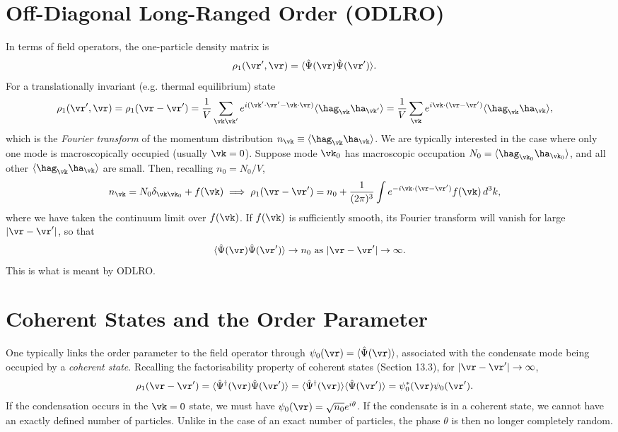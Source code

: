 \documentclass[qo.tex]{subfiles}
\begin{document}
\section{Off-Diagonal Long-Ranged Order (ODLRO)}
In terms of field operators, the one-particle density matrix is 
\begin{align}
    \rho_1(\vr',\vr) &= \langle\hat{\Psi}(\vr)\hat{\Psi}(\vr')\rangle.
\end{align}
For a translationally invariant (e.g. thermal equilibrium) state
\begin{align}
    \rho_1(\vr',\vr) &= \rho_1(\vr-\vr') = \frac{1}{V}\sum_{\vk\vk'} e^{i(\vk'\cdot\vr'-\vk\cdot\vr)}\langle\hag_{\vk}\ha_{\vk'}\rangle = \frac{1}{V}\sum_{\vk}e^{i\vk\cdot(\vr-\vr')}\langle\hag_{\vk}\ha_{\vk}\rangle,
\end{align}
which is the \emph{Fourier transform} of the momentum distribution $n_{\vk}\equiv \langle\hag_{\vk}\ha_{\vk}\rangle$.
We are typically interested in the case where only one mode is macroscopically occupied (usually $\vk=0$).
Suppose mode $\vk_0$ has macroscopic occupation $N_0=\langle\hag_{\vk_0}\ha_{\vk_0}\rangle$, and all other $\langle\hag_{\vk}\ha_{\vk}\rangle$ are small. 
Then, recalling $n_0=N_0/V$,
\begin{align}
    n_{\vk} &= N_0\delta_{\vk\vk_0} + f(\vk) \implies \rho_1(\vr-\vr') = n_0 + \frac{1}{(2\pi)^3}\int e^{-i\vk\cdot(\vr-\vr')}f(\vk)\,d^3k,
\end{align}
where we have taken the continuum limit over $f(\vk)$.
If $f(\vk)$ is sufficiently smooth, its Fourier transform will vanish for large $|\vr-\vr'|$, so that 
\begin{align}
    \langle\hat{\Psi}(\vr)\hat{\Psi}(\vr')\rangle \to n_0 \text{ as } |\vr-\vr'| \to \infty.
\end{align}
This is what is meant by ODLRO.

\section{Coherent States and the Order Parameter}
One typically links the order parameter to the field operator through $\psi_0(\vr)=\langle\hat{\Psi}(\vr)\rangle$, associated with the condensate mode being occupied by a \emph{coherent state}.
Recalling the factorisability property of coherent states (Section 13.3), for $|\vr-\vr'|\to\infty$,
\begin{align}
    \rho_1(\vr-\vr') &= \langle\hat{\Psi}^\dagger(\vr)\hat{\Psi}(\vr')\rangle = \langle\hat{\Psi}^\dagger(\vr)\rangle\langle\hat{\Psi}(\vr')\rangle = \psi_0^*(\vr)\psi_0(\vr').
\end{align}
If the condensation occurs in the $\vk=0$ state, we must have $\psi_0(\vr)=\sqrt{n_0}e^{i\theta}$.
If the condensate is in a coherent state, we cannot have an exactly defined number of particles. 
Unlike in the case of an exact number of particles, the phase $\theta$ is then no longer completely random. 
\end{document}
